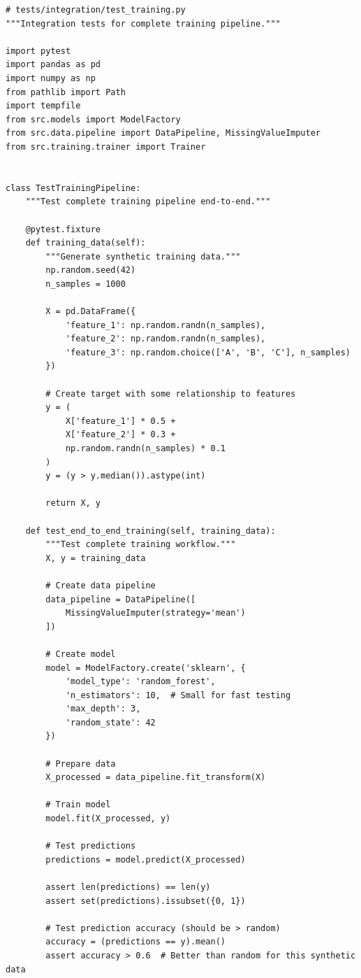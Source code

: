 \begin{lstlisting}[style=python, caption=Integration tests for training pipeline]
# tests/integration/test_training.py
"""Integration tests for complete training pipeline."""

import pytest
import pandas as pd
import numpy as np
from pathlib import Path
import tempfile
from src.models import ModelFactory
from src.data.pipeline import DataPipeline, MissingValueImputer
from src.training.trainer import Trainer


class TestTrainingPipeline:
    """Test complete training pipeline end-to-end."""

    @pytest.fixture
    def training_data(self):
        """Generate synthetic training data."""
        np.random.seed(42)
        n_samples = 1000

        X = pd.DataFrame({
            'feature_1': np.random.randn(n_samples),
            'feature_2': np.random.randn(n_samples),
            'feature_3': np.random.choice(['A', 'B', 'C'], n_samples)
        })

        # Create target with some relationship to features
        y = (
            X['feature_1'] * 0.5 +
            X['feature_2'] * 0.3 +
            np.random.randn(n_samples) * 0.1
        )
        y = (y > y.median()).astype(int)

        return X, y

    def test_end_to_end_training(self, training_data):
        """Test complete training workflow."""
        X, y = training_data

        # Create data pipeline
        data_pipeline = DataPipeline([
            MissingValueImputer(strategy='mean')
        ])

        # Create model
        model = ModelFactory.create('sklearn', {
            'model_type': 'random_forest',
            'n_estimators': 10,  # Small for fast testing
            'max_depth': 3,
            'random_state': 42
        })

        # Prepare data
        X_processed = data_pipeline.fit_transform(X)

        # Train model
        model.fit(X_processed, y)

        # Test predictions
        predictions = model.predict(X_processed)

        assert len(predictions) == len(y)
        assert set(predictions).issubset({0, 1})

        # Test prediction accuracy (should be > random)
        accuracy = (predictions == y).mean()
        assert accuracy > 0.6  # Better than random for this synthetic data


\end{lstlisting}

